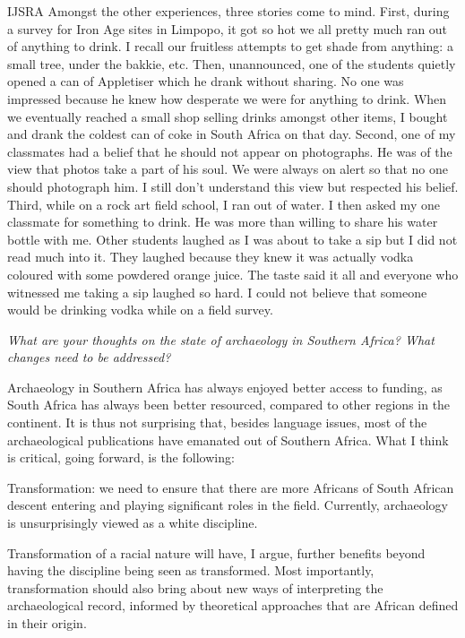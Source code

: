 \begin{labeling}{IJSRA}
Amongst the other experiences, three stories come to mind. First, during a survey for Iron Age sites in Limpopo, it got so hot we all pretty much ran out of anything to drink. I recall our fruitless attempts to get shade from anything: a small tree, under the bakkie, etc. Then, unannounced, one of the students quietly opened a can of Appletiser which he drank without sharing. No one was impressed because he knew how desperate we were for anything to drink. When we eventually reached a small shop selling drinks amongst other items, I bought and drank the coldest can of coke in South Africa on that day. Second, one of my classmates had a belief that he should not appear on photographs. He was of the view that photos take a part of his soul. We were always on alert so that no one should photograph him. I still don't understand this view but respected his belief. Third, while on a rock art field school, I ran out of water. I then asked my one classmate for something to drink. He was more than willing to share his water bottle with me. Other students laughed as I was about to take a sip but I did not read much into it. They laughed because they knew it was actually vodka coloured with some powdered orange juice. The taste said it all and everyone who witnessed me taking a sip laughed so hard. I could not believe that someone would be drinking vodka while on a field survey.



\item[IJSRA] \emph{What are your thoughts on the state of archaeology in Southern Africa? What changes need to be addressed?}
	
\item[NN]
Archaeology in Southern Africa has always enjoyed better access to funding, as South Africa has always been better resourced, compared to other regions in the continent. It is thus not surprising that, besides language issues, most of the archaeological publications have emanated out of Southern Africa. What I think is critical, going forward, is the following:
\begin{labeling}
\protect\item[a)] Transformation: we need to ensure that there are more Africans of South African descent entering and playing significant roles in the field. Currently, archaeology is unsurprisingly viewed as a white discipline.
\protect\item[b)] Transformation of a racial nature will have, I argue, further benefits beyond having the discipline being seen as transformed. Most importantly, transformation should also bring about new ways of interpreting the archaeological record, informed by theoretical approaches that are African defined in their origin.
\end{labeling}


\end{labeling}
